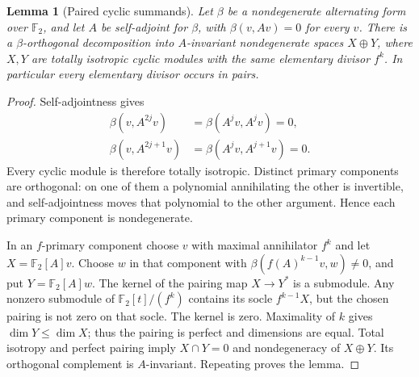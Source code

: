 \documentclass[11pt,a4paper]{article}
\newtheorem{lemma}[theorem]{Lemma}
\theoremstyle{definition}
\theoremstyle{remark}
\numberwithin{equation}{section}
\newcommand{\F}{\mathbb F}
\begin{document}
\begin{lemma}[Paired cyclic summands]\label{lem:paired}
Let \(\beta\) be a nondegenerate alternating form over \(\F_2\), and
let \(A\) be self-adjoint for \(\beta\), with \(\beta(v,Av)=0\) for
every \(v\). There is a \(\beta\)-orthogonal decomposition into
\(A\)-invariant nondegenerate spaces \(X\oplus Y\), where \(X,Y\) are
totally isotropic cyclic modules with the same elementary divisor
\(f^k\). In particular every elementary divisor occurs in pairs.
\end{lemma}
\begin{proof}
Self-adjointness gives
\[
\begin{aligned}
 \beta(v,A^{2j}v)&=\beta(A^jv,A^jv)=0,\\
 \beta(v,A^{2j+1}v)&=\beta(A^jv,A^{j+1}v)=0.
\end{aligned}
\]
Every cyclic module is therefore totally isotropic.
Distinct primary components are orthogonal: on one of them a
polynomial annihilating the other is invertible, and self-adjointness
moves that polynomial to the other argument. Hence each primary
component is nondegenerate.

In an \(f\)-primary component choose \(v\) with maximal annihilator
\(f^k\) and let \(X=\F_2[A]v\).
Choose \(w\) in that component with
\(\beta(f(A)^{k-1}v,w)\ne0\), and put \(Y=\F_2[A]w\).
The kernel of the pairing map \(X\to Y^*\) is a submodule.
Any nonzero submodule of \(\F_2[t]/(f^k)\) contains its socle
\(f^{k-1}X\), but the chosen pairing is not zero on that socle.
The kernel is zero. Maximality of \(k\) gives \(\dim Y\leq\dim X\);
thus the pairing is perfect and dimensions are equal.
Total isotropy and perfect pairing imply \(X\cap Y=0\) and
nondegeneracy of \(X\oplus Y\). Its orthogonal complement is
\(A\)-invariant. Repeating proves the lemma.
\end{proof}
\end{document}
